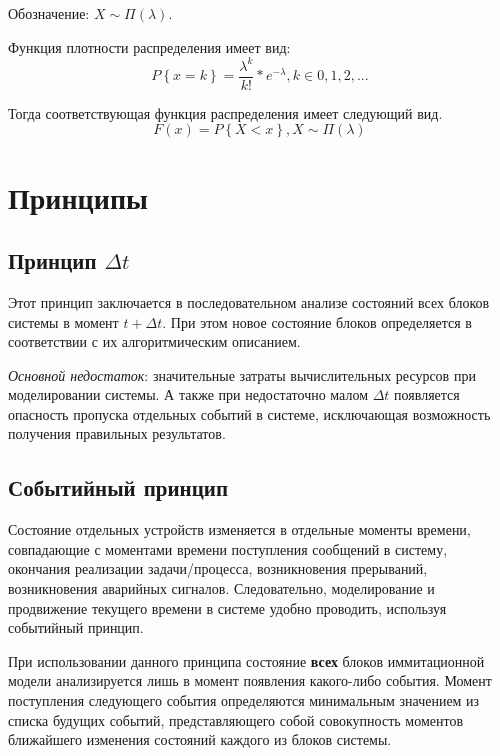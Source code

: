 Обозначение: $X \sim \Pi(\lambda)$.

Функция плотности распределения имеет вид:
\begin{equation}
	P\left\{x = k\right\} = \frac {{\lambda}^k}{k!} * {e}^{- \lambda}, k \in 0, 1, 2, ...
\end{equation}

Тогда соответствующая функция распределения имеет следующий вид.
\begin{equation}
	F(x) = P\left\{X < x\right\}, X \sim \Pi(\lambda)
\end{equation}

\section{Принципы}

\subsection{Принцип $ \Delta t $}
Этот принцип заключается в последовательном анализе состояний всех блоков системы в момент $t + \Delta t $. При этом новое состояние блоков определяется в соответствии с их алгоритмическим описанием. 

\textit{Основной недостаток}: значительные затраты вычислительных ресурсов при моделировании системы. А также при недостаточно малом $\Delta t$ появляется опасность пропуска отдельных событий в системе, исключающая возможность получения правильных результатов.

\subsection{Событийный принцип}
Состояние отдельных устройств изменяется в отдельные моменты времени, совпадающие с моментами времени поступления сообщений в систему, окончания реализации задачи/процесса, возникновения прерываний, возникновения аварийных сигналов. Следовательно, моделирование и продвижение текущего времени в системе удобно проводить, используя событийный принцип.

При использовании данного принципа состояние \textbf{всех} блоков иммитационной модели анализируется лишь в момент появления какого-либо события. Момент поступления следующего события определяются минимальным значением из списка будущих событий, представляющего собой совокупность моментов ближайшего изменения состояний каждого из блоков системы.
